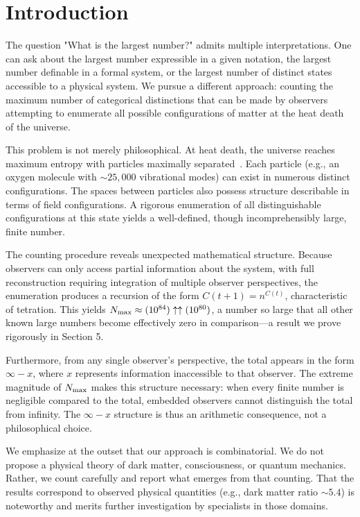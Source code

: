 \section{Introduction}

The question "What is the largest number?" admits multiple interpretations. One can ask about the largest number expressible in a given notation, the largest number definable in a formal system, or the largest number of distinct states accessible to a physical system. We pursue a different approach: counting the maximum number of categorical distinctions that can be made by observers attempting to enumerate all possible configurations of matter at the heat death of the universe.

This problem is not merely philosophical. At heat death, the universe reaches maximum entropy with particles maximally separated~\cite{PenroseRoadToReality}. Each particle (e.g., an oxygen molecule with $\sim 25{,}000$ vibrational modes) can exist in numerous distinct configurations. The spaces between particles also possess structure describable in terms of field configurations. A rigorous enumeration of all distinguishable configurations at this state yields a well-defined, though incomprehensibly large, finite number.

The counting procedure reveals unexpected mathematical structure. Because observers can only access partial information about the system, with full reconstruction requiring integration of multiple observer perspectives, the enumeration produces a recursion of the form $C(t+1) = n^{C(t)}$, characteristic of tetration. This yields $N_{\text{max}} \approx (10^{84}) \uparrow\uparrow (10^{80})$, a number so large that all other known large numbers become effectively zero in comparison—a result we prove rigorously in Section 5.

Furthermore, from any single observer's perspective, the total appears in the form $\infty - x$, where $x$ represents information inaccessible to that observer. The extreme magnitude of $N_{\text{max}}$ makes this structure necessary: when every finite number is negligible compared to the total, embedded observers cannot distinguish the total from infinity. The $\infty - x$ structure is thus an arithmetic consequence, not a philosophical choice.

We emphasize at the outset that our approach is combinatorial. We do not propose a physical theory of dark matter, consciousness, or quantum mechanics. Rather, we count carefully and report what emerges from that counting. That the results correspond to observed physical quantities (e.g., dark matter ratio $\sim 5.4$) is noteworthy and merits further investigation by specialists in those domains.

